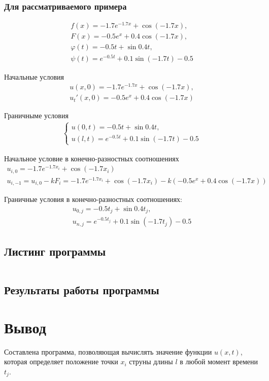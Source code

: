 \subsubsection*{Для рассматриваемого примера}

\begin{align}
	f(x) = -1.7 e^{-1.7 x} + \cos(-1.7 x), \\
	F(x) = -0.5 e^x + 0.4 \cos(-1.7 x),    \\
	\varphi(t) = -0.5 t + \sin{0.4 t},     \\
	\psi(t) = e^{-0.5 t} + 0.1 \sin(-1.7 t) - 0.5
\end{align}

Начальные  условия
\begin{align}
	u(x, 0) = -1.7 e^{-1.7 x} + \cos(-1.7 x), \\
	u_t'(x, 0)= -0.5 e^x + 0.4 \cos(-1.7 x)
\end{align}

Граничныме условия
\begin{align}
	\begin{cases}
		u(0,t) = -0.5 t + \sin{0.4 t}, \\
		u(l,t) = e^{-0.5 t} + 0.1 \sin(-1.7 t) - 0.5
	\end{cases}
\end{align}

Начальное условие в конечно-разностных соотношениях
\begin{align}
	u_{i,0} = -1.7 e^{-1.7 x_i} + \cos(-1.7 x_i) \\
	u_{i,-1} = u_{i,0} - k F_i = -1.7 e^{-1.7 x_i} + \cos(-1.7 x_i) - k (-0.5 e^x + 0.4 \cos(-1.7 x)
	)
\end{align}

Граничные условия в конечно-разностных соотношениях:
\begin{align}
	u_{0,j} = -0.5 t_j + \sin{0.4 t_j}, \\
	u_{n,j} = e^{-0.5 t_j} + 0.1 \sin(-1.7 t_j) - 0.5
\end{align}

\subsection{Листинг программы}
\inputminted[frame=lines, linenos]{cpp}{listings/main.cc}

\subsection{Результаты работы программы}

\section{Вывод}
Составлена программа, позволяющая вычислять значение функции \(u(x,t)\), которая определяет положение точки \(x_i\) струны длины \(l\) в любой момент времени \(t_j\).

